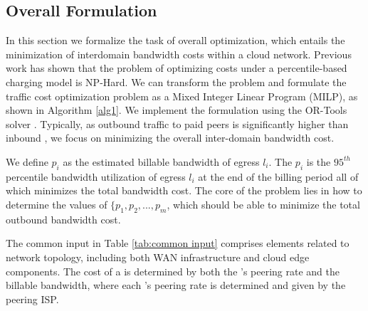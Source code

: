 \subsection{Overall Formulation}    \label{sec:overall-opt}
{In this section we formalize the task of overall optimization, which entails the minimization of interdomain bandwidth costs within a cloud network. Previous work \cite{goldenberg2004optimizing} has shown that the problem of optimizing costs under a percentile-based charging model is NP-Hard. We can transform the problem and formulate the traffic cost optimization problem as a Mixed Integer Linear Program (MILP), as shown in Algorithm \ref{alg1}. We implement the formulation using the OR-Tools solver \cite{or-tools}. Typically, as outbound traffic to paid peers is significantly higher than inbound \cite{singh2021costCascara}, we focus on minimizing the overall inter-domain bandwidth cost.}

We define $p_i$ as the estimated billable bandwidth of egress $l_i$. The $p_i$ is the $95^{th}$ percentile bandwidth utilization of egress $l_i$ at the end of the billing period all of which minimizes the total bandwidth cost.
The core of the problem lies in how to determine the values of $\{p_1, p_2,..., p_{m}$, which should be able to minimize the total outbound bandwidth cost.


The common input in Table \ref{tab:common input} comprises elements related to network topology, including both WAN infrastructure and cloud edge components. The cost of a {\egress} is determined by both the {\egress}'s peering rate and the billable bandwidth, where each {\egress}'s peering rate is determined and given by the peering ISP.


